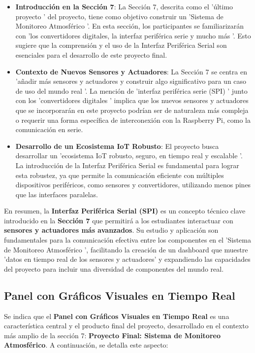 \documentclass{report}
\begin{document}
\begin{itemize}
    \item \textbf{Introducción en la Sección 7}: La Sección 7, descrita como el  'último proyecto ' del proyecto, tiene como objetivo construir un 
     'Sistema de Monitoreo Atmosférico '. En esta sección, los participantes se familiarizarán con  'los convertidores digitales, la interfaz periférica serie 
    y mucho más '. Esto sugiere que la comprensión y el uso de la Interfaz Periférica Serial son esenciales para el desarrollo de este proyecto final.
    \item \textbf{Contexto de Nuevos Sensores y Actuadores}: La Sección 7 se centra en  'añadir más sensores y actuadores y construir algo significativo para un 
    caso de uso del mundo real '. La mención de  'interfaz periférica serie (SPI) ' junto con los  'convertidores digitales ' implica que los nuevos sensores y 
    actuadores que se incorporarán en este proyecto podrían ser de naturaleza más compleja o requerir una forma específica de interconexión con la Raspberry Pi, 
    como la comunicación en serie.
    \item \textbf{Desarrollo de un Ecosistema IoT Robusto}: El proyecto busca desarrollar un  'ecosistema IoT robusto, seguro, en tiempo real y escalable '. 
    La introducción de la Interfaz Periférica Serial es fundamental para lograr esta robustez, ya que permite la comunicación eficiente con múltiples 
    dispositivos periféricos, como sensores y convertidores, utilizando menos pines que las interfaces paralelas.
\end{itemize}
En resumen, la \textbf{Interfaz Periférica Serial (SPI)} es un concepto técnico clave introducido en la \textbf{Sección 7} que permitirá a los estudiantes 
interactuar con \textbf{sensores y actuadores más avanzados}. Su estudio y aplicación son fundamentales para la comunicación efectiva entre los componentes 
en el  'Sistema de Monitoreo Atmosférico ', facilitando la creación de un dashboard que muestre  'datos en tiempo real de los sensores y actuadores' y 
expandiendo las capacidades del proyecto para incluir una diversidad de componentes del mundo real.

\subsection{Panel con Gráficos Visuales en Tiempo Real}
Se indica que el \textbf{Panel con Gráficos Visuales en Tiempo Real} es una característica central y el producto final del proyecto, desarrollado 
en el contexto más amplio de la sección 7: \textbf{Proyecto Final: Sistema de Monitoreo Atmosférico}.
A continuación, se detalla este aspecto:
\end{document}
